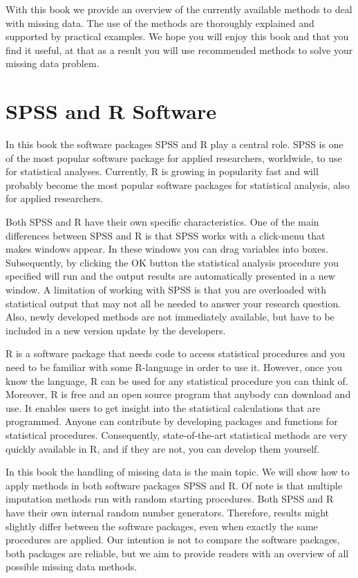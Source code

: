 \documentclass[
]{book}
\begin{document}
With this book we provide an overview of the currently available methods to deal with missing data. The use of the methods are thoroughly explained and supported by practical examples. We hope you will enjoy this book and that you find it useful, at that as a result you will use recommended methods to solve your missing data problem.

\hypertarget{spss-and-r-software}{%
\section*{SPSS and R Software}\label{spss-and-r-software}}

In this book the software packages SPSS and R play a central role. SPSS is one of the most popular software package for applied researchers, worldwide, to use for statistical analyses. Currently, R is growing in popularity fast and will probably become the most popular software packages for statistical analysis, also for applied researchers.

Both SPSS and R have their own specific characteristics. One of the main differences between SPSS and R is that SPSS works with a click-menu that makes windows appear. In these windows you can drag variables into boxes. Subsequently, by clicking the OK button the statistical analysis procedure you specified will run and the output results are automatically presented in a new window. A limitation of working with SPSS is that you are overloaded with statistical output that may not all be needed to answer your research question. Also, newly developed methods are not immediately available, but have to be included in a new version update by the developers.

R is a software package that needs code to access statistical procedures and you need to be familiar with some R-language in order to use it. However, once you know the language, R can be used for any statistical procedure you can think of. Moreover, R is free and an open source program that anybody can download and use. It enables users to get insight into the statistical calculations that are programmed. Anyone can contribute by developing packages and functions for statistical procedures. Consequently, state-of-the-art statistical methods are very quickly available in R, and if they are not, you can develop them yourself.

In this book the handling of missing data is the main topic. We will show how to apply methods in both software packages SPSS and R. Of note is that multiple imputation methods run with random starting procedures. Both SPSS and R have their own internal random number generators. Therefore, results might slightly differ between the software packages, even when exactly the same procedures are applied. Our intention is not to compare the software packages, both packages are reliable, but we aim to provide readers with an overview of all possible missing data methods.
\end{document}

